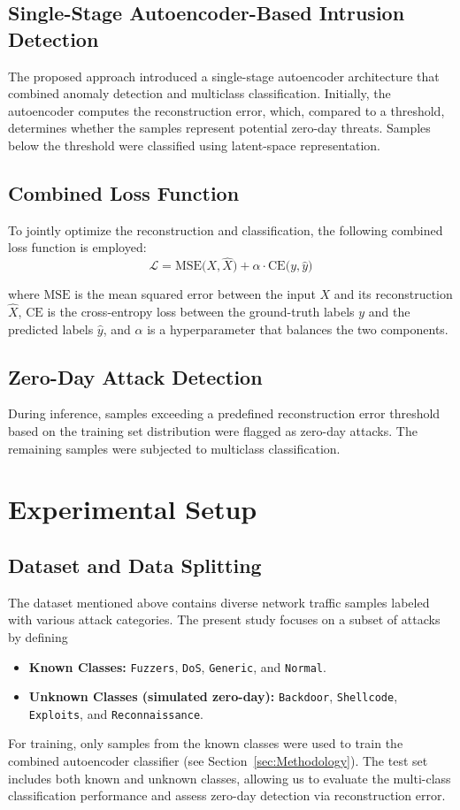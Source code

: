 \documentclass[runningheads]{llncs}
\begin{document}
\subsection{Single-Stage Autoencoder-Based Intrusion Detection}
The proposed approach introduced a single-stage autoencoder architecture that combined anomaly detection and multiclass classification. Initially, the autoencoder computes the reconstruction error, which, compared to a threshold, determines whether the samples represent potential zero-day threats. Samples below the threshold were classified using latent-space representation.

\subsection{Combined Loss Function}
To jointly optimize the reconstruction and classification, the following combined loss function is employed:
\begin{equation}
    \mathcal{L} = \text{MSE}\bigl(X, \hat{X}\bigr) + \alpha \cdot \text{CE}\bigl(y, \hat{y}\bigr)
\end{equation}

where \(\text{MSE}\) is the mean squared error between the input \(X\) and its reconstruction \(\hat{X}\), \(\text{CE}\) is the cross-entropy loss between the ground-truth labels \(y\) and the predicted labels \(\hat{y}\), and \(\alpha\) is a hyperparameter that balances the two components.

\subsection{Zero-Day Attack Detection}
During inference, samples exceeding a predefined reconstruction error threshold based on the training set distribution were flagged as zero-day attacks. The remaining samples were subjected to multiclass classification.

\section{Experimental Setup}
\subsection{Dataset and Data Splitting}
The dataset mentioned above contains diverse network traffic samples labeled with various attack categories. The present study focuses on a subset of attacks by defining
\begin{itemize}
    \item \textbf{Known Classes:} \texttt{Fuzzers}, \texttt{DoS}, \texttt{Generic}, and \texttt{Normal}.
    \item \textbf{Unknown Classes (simulated zero-day):} \texttt{Backdoor}, \texttt{Shellcode}, \texttt{Exploits}, and \texttt{Reconnaissance}.
\end{itemize}
For training, only samples from the known classes were used to train the combined autoencoder classifier (see Section~\ref{sec:Methodology}). The test set includes both known and unknown classes, allowing us to evaluate the multi-class classification performance and assess zero-day detection via reconstruction error.
\end{document}
